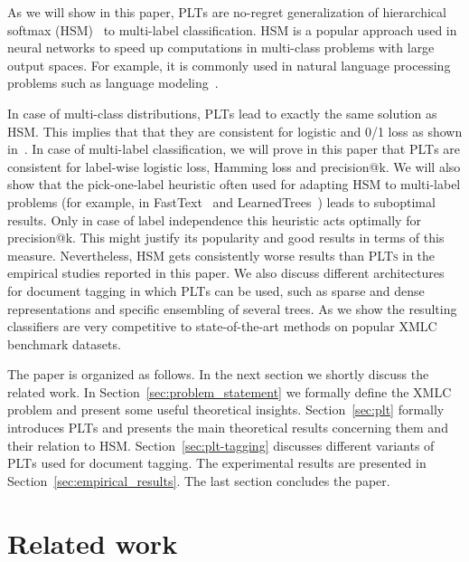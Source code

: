 \documentclass{article}
\newcommand{\Algo}[1]{\textsc{#1}}
\newcommand{\sectionBefore}{-0pt}
\newcommand{\sectionAfter}{-0pt}
\begin{document}
As we will show in this paper, \Algo{PLT}s are no-regret generalization of hierarchical softmax (HSM)~\citep{Morin_Bengio_2005} to multi-label classification. HSM is a popular approach used in neural networks to speed up computations in multi-class problems with large output spaces. For example, it is commonly used in natural language processing problems such as language modeling~\citep{Mikolov_et_al_2013}.  


In case of multi-class distributions, \Algo{PLT}s lead to exactly the same solution as HSM. This implies that that they are consistent for logistic and 0/1 loss as shown in~\citep{Dembczynski_et_al_2016}. In case of multi-label classification, we will prove in this paper that \Algo{PLT}s are consistent for label-wise logistic loss, Hamming loss and precision@k. We will also show that the pick-one-label heuristic often used for adapting \Algo{HSM} to multi-label problems (for example, in FastText~\citep{Joulin_et_al_2016} and LearnedTrees~\citep{Jernite_et_al_2017}) leads to suboptimal results. Only in case of label independence this heuristic acts optimally for precision@k. This might justify its popularity and good results in terms of this measure. Nevertheless, \Algo{HSM} gets consistently worse results than \Algo{PLTs} in the empirical studies reported in this paper. 
%
We also discuss different architectures for document tagging in which \Algo{PLT}s can be used, such as sparse and dense representations and specific ensembling of several trees. As we show the resulting classifiers are very competitive to state-of-the-art methods on popular XMLC benchmark datasets. 

The paper is organized as follows. In the next section we shortly discuss the related work. In Section~\ref{sec:problem_statement} we formally define the XMLC problem and present some useful theoretical insights. Section~\ref{sec:plt} formally introduces \Algo{PLT}s and presents the main theoretical results concerning them and their relation to \Algo{HSM}. Section~\ref{sec:plt-tagging} discusses different variants of \Algo{PLT}s used for document tagging. The experimental results are presented in Section~\ref{sec:empirical_results}. The last section concludes the paper. 


\vspace{\sectionBefore}
\section{Related work}
\label{sec:related_work}
\vspace{\sectionAfter}
\end{document}
